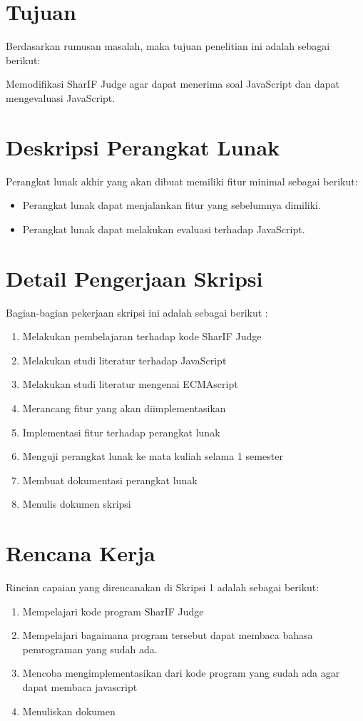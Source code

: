 \documentclass[a4paper,twoside]{article}
\begin{document}
\section{Tujuan}
\label{sec:tujuan}
Berdasarkan rumusan masalah, maka tujuan penelitian ini adalah sebagai berikut:

    Memodifikasi SharIF Judge agar dapat menerima soal JavaScript dan dapat mengevaluasi JavaScript.


\section{Deskripsi Perangkat Lunak}
Perangkat lunak akhir yang akan dibuat memiliki fitur minimal sebagai berikut:
\begin{itemize}
	\item Perangkat lunak dapat menjalankan fitur yang sebelumnya dimiliki.
	\item Perangkat lunak dapat melakukan evaluasi terhadap JavaScript.
		
\end{itemize}

\section{Detail Pengerjaan Skripsi}
Bagian-bagian pekerjaan skripsi ini adalah sebagai berikut :
	\begin{enumerate}
		\item Melakukan pembelajaran terhadap kode SharIF Judge
		\item Melakukan studi literatur terhadap JavaScript
		\item Melakukan studi literatur mengenai ECMAscript
		\item Merancang fitur yang akan diimplementasikan
		\item Implementasi fitur terhadap perangkat lunak
		\item Menguji perangkat lunak ke mata kuliah selama 1 semester
		\item Membuat dokumentasi perangkat lunak
		\item Menulis dokumen skripsi
	\end{enumerate}

\section{Rencana Kerja}
Rincian capaian yang direncanakan di Skripsi 1 adalah sebagai berikut:
\begin{enumerate}
\item Mempelajari kode program SharIF Judge
\item Mempelajari bagaimana program tersebut dapat membaca bahasa pemrograman yang sudah ada.
\item Mencoba mengimplementasikan dari kode program yang sudah ada agar dapat membaca javascript 
\item Menuliskan dokumen
\end{enumerate}
\end{document}
